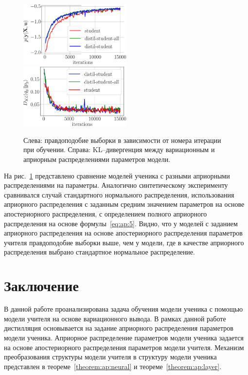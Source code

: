 \documentclass[12pt]{a&t}
\begin{document}
\begin{figure}[h!]
\includegraphics[width=0.5\textwidth]{fashionmnist_likelihood_2_layers.eps}
\includegraphics[width=0.5\textwidth]{fashionmnist_D_KL_2_layers.eps}
\caption{Слева: правдоподобие выборки в зависимости от номера итерации при обучении. Справа: KL--дивергенция между вариационным и априорным распределениями параметров модели.}
\label{exp:fig3}
\end{figure}

На рис.~\ref{exp:fig3} представлено сравнение моделей ученика с разными априорными распределениями на параметры. Аналогично синтетическому эксперименту сравнивался случай стандартного нормального распределения, использования априорного распределения с заданным средним значением параметров на основе апостериорного распределения, с определением полного априорного распределения на основе формулы~\eqref{eq:ap:5}. Видно, что у моделей с заданием априорного распределения на основе апостериорного распределения параметров учителя правдоподобие выборки выше, чем у модели, где в качестве априорного распределения выбрано стандартное нормальное распределение.

\section{Заключение}

В данной работе проанализирована задача обучения модели ученика с помощью модели учителя на основе вариационного вывода.
В рамках данной работе дистилляция основывается на задание априорного распределения параметров модели ученика.
Априорное распределение параметров модели ученика задается на основе апостериорного распределения параметров модели учителя.
Механизм преобразования структуры модели учителя в структуру модели ученика представлен в теореме~\ref{theorem:ap:neural} и теореме~\ref{theorem:ap:layer}.
\end{document}
